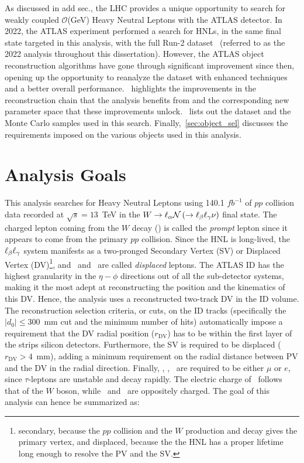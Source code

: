 As discussed in {\color{red}add sec.}, the LHC provides a unique opportunity to search for weakly coupled $\mathcal{O}$(GeV) Heavy Neutral Leptons with the ATLAS detector. In 2022, the ATLAS experiment performed a search for HNLs, in the same final state targeted in this analysis, with the full Run-2 dataset~\cite{PhysRevLett.131.061803} (referred to as the 2022 analysis throughout this dissertation). However, the ATLAS object reconstruction algorithms have gone through significant improvement since then, opening up the opportunity to reanalyze the dataset with enhanced techniques and a better overall performance.~ highlights the improvements in the reconstruction chain that the analysis benefits from and the corresponding new parameter space that these improvements unlock.~ lists out the dataset and the Monte Carlo samples used in this search. Finally,~\cref{sec:object_sel} discusses the requirements imposed on the various objects used in this analysis.


\section{Analysis Goals}\label{sec:ana_goals}

This analysis searches for Heavy Neutral Leptons using 140.1 $fb^{-1}$ of $pp$ collision data recorded at $\sqrt{s}=13$~TeV in the $W\rightarrow \ell_\alpha \mathcal{N}\left(\rightarrow\ell_\beta\ell_\gamma\nu \right)$ final state. The charged lepton coming from the $W$ decay (\ela) is called the \textit{prompt} lepton since it appears to come from the primary $pp$ collision. Since the HNL is long-lived, the $\ell_\beta\ell_\gamma$ system manifests as a two-pronged Secondary Vertex (SV) or Displaced Vertex (DV)\footnote{secondary, because the $pp$ collision and the $W$ production and decay gives the primary vertex, and displaced, because the the HNL has a proper lifetime long enough to resolve the PV and the SV.}, and \elb~and \elg~are called \textit{displaced} leptons. The ATLAS ID has the highest granularity in the $\eta-\phi$ directions out of all the sub-detector systems, making it the most adept at reconstructing the position and the kinematics of this DV. Hence, the analysis uses a reconstructed two-track DV in the ID volume. The reconstruction selection criteria, or cuts, on the ID tracks (specifically the $|d_0|\leq 300$~mm cut and the minimum number of hits) automatically impose a requirement that the DV radial position ($r_\mathrm{DV}$) has to be within the first layer of the strips silicon detectors. Furthermore, the SV is required to be displaced ($r_\mathrm{DV}>4$~mm), adding a minimum requirement on the radial distance between PV and the DV in the radial direction. Finally, \ela, \elb, \elg~are required to be either $\mu$ or $e$, since $\tau$-leptons are unstable and decay rapidly. The electric charge of \ela~follows that of the $W$ boson, while \elb~and \elg~are oppositely charged. The goal of this analysis can hence be summarized as:

